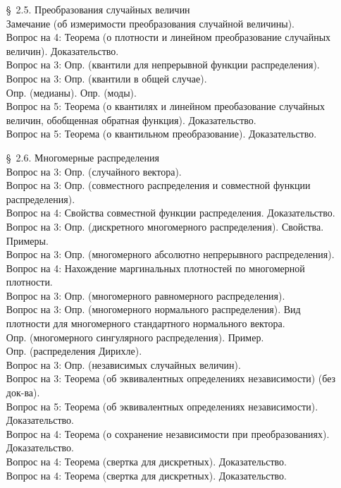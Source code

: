 \documentclass[10pt]{amsart}
\begin{document}
\begin{enumerate}
\begin{enumerate}
\item[\S\, 2.5.] Преобразования случайных величин \\
Замечание (об измеримости преобразования случайной величины). \\
Вопрос на 4: Теорема (о плотности и линейном преобразование случайных величин). Доказательство. \\
Вопрос на 3:   Опр. (квантили для непрерывной функции распределения). \\
Вопрос на 3:  Опр. (квантили в общей случае). \\
Опр. (медианы).   Опр. (моды). \\
Вопрос на 5:   Теорема (о квантилях и линейном преобазование случайных величин, обобщенная обратная функция). Доказательство. \\
Вопрос на 5: Теорема (о квантильном преобразование). Доказательство. \\

    
\item[\S\, 2.6.] Многомерные распределения \\
Вопрос на 3: Опр. (случайного вектора). \\
Вопрос на 3: Опр. (совместного распределения и  совместной функции распределения). \\
Вопрос на 4: Свойства совместной функции распределения. Доказательство. \\
Вопрос на 3: Опр. (дискретного многомерного распределения). Свойства. Примеры. \\
Вопрос на 3: Опр. (многомерного абсолютно непрерывного распределения). \\
Вопрос на 4: Нахождение маргинальных плотностей по многомерной плотности. \\
Вопрос на 3: Опр. (многомерного равномерного распределения). \\
Вопрос на 3: Опр. (многомерного нормального распределения). Вид плотности для многомерного стандартного нормального вектора. \\ 
Опр. (многомерного сингулярного распределения). Пример. \\
Опр. (распределения Дирихле). \\
Вопрос на 3: Опр. (независимых случайных величин). \\
Вопрос на 3: Теорема (об эквивалентных определениях независимости) (без док-ва). \\
Вопрос на 5: Теорема (об эквивалентных определениях независимости). Доказательство. \\
Вопрос на 4: Теорема (о сохранение независимости при преобразованиях). Доказательство. \\ 
Вопрос на 4: Теорема (свертка для дискретных). Доказательство. \\
Вопрос на 4: Теорема (свертка для дискретных).  Доказательство. \\
\end{enumerate}
    

\end{enumerate}
\end{document}
